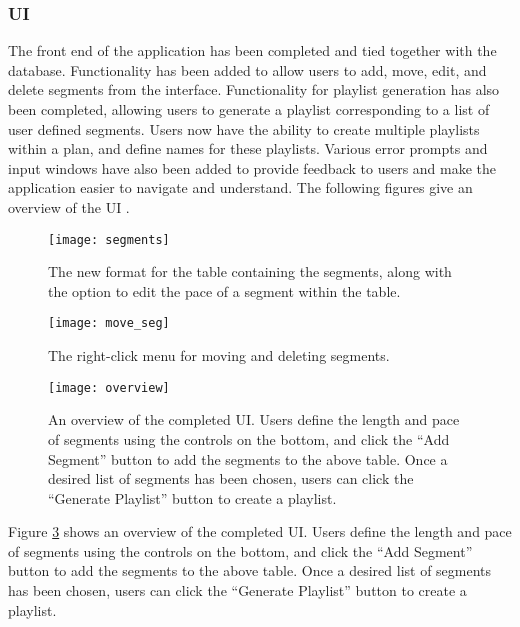 \documentclass{article}
\begin{document}
\subsubsection{UI}

The front end of the application has been completed and tied together with the database. Functionality has been added to allow users to add, move, edit, and delete segments from the interface. Functionality for playlist generation has also been completed, allowing users to generate a playlist corresponding to a list of user defined segments. Users now have the ability to create multiple playlists within a plan, and define names for these playlists. Various error prompts and input windows have also been added to provide feedback to users and make the application easier to navigate and understand. The following figures give an overview of the UI \cite{PyQT_tut} \cite{PyQT_guide}.

\begin{figure}[h]
\centering
\captionsetup{justification=centering}
\texttt{[image: segments]}
\caption{The new format for the table containing the segments, along with the option to edit the pace of a segment within the table.}
\label{fig:segments}
\end{figure}

\begin{figure}[h]
\centering
\captionsetup{justification=centering}
\texttt{[image: move\_seg]}
\caption{The right-click menu for moving and deleting segments.}
\label{fig:move_seg}
\end{figure}

\begin{figure}[h]
\centering
\captionsetup{justification=centering}
\texttt{[image: overview]}
\caption{An overview of the completed UI. Users define the length and pace of segments using the controls on the bottom, and click the ``Add Segment'' button to add the segments to the above table. Once a desired list of segments has been chosen, users can click the ``Generate Playlist'' button to create a playlist.}
\label{fig:overview}
\end{figure}

Figure \ref{fig:overview} shows an overview of the completed UI. Users define the length and pace of segments using the controls on the bottom, and click the ``Add Segment'' button to add the segments to the above table. Once a desired list of segments has been chosen, users can click the ``Generate Playlist'' button to create a playlist.
\end{document}
